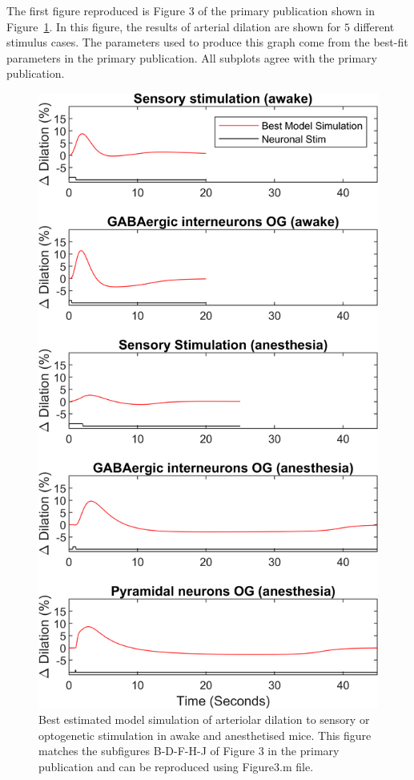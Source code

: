 \documentclass[fleqn,10pt]{physiome}
\begin{document}
The first figure reproduced is Figure $3$ of the primary publication shown in Figure~\ref{fig:2}. In this figure, the results of arterial dilation are shown for $5$ different stimulus cases. The parameters used to produce this graph come from the best-fit parameters in the primary publication. All subplots agree with the primary publication. 

\begin{figure}[htbp]
    \centering
    \includegraphics[scale=0.7,keepaspectratio]{Figure3.png}
    \caption{Best estimated model simulation of arteriolar dilation to sensory or optogenetic stimulation in awake and anesthetised mice. This figure matches the subfigures B-D-F-H-J of Figure $3$ in the primary publication and can be reproduced using Figure3.m file.}
    \label{fig:2}
\end{figure}
\end{document}
